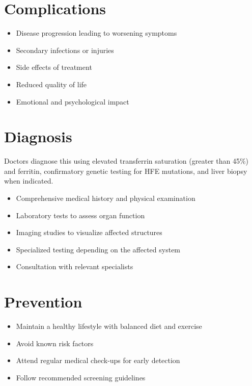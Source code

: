 \section{Complications}
\begin{itemize}[noitemsep]
  \item Disease progression leading to worsening symptoms
  \item Secondary infections or injuries
  \item Side effects of treatment
  \item Reduced quality of life
  \item Emotional and psychological impact
\end{itemize}
\section{Diagnosis}
Doctors diagnose this using elevated transferrin saturation (greater than 45\%) and ferritin, confirmatory genetic testing for HFE mutations, and liver biopsy when indicated.

\begin{itemize}[noitemsep]
  \item Comprehensive medical history and physical examination
  \item Laboratory tests to assess organ function
  \item Imaging studies to visualize affected structures
  \item Specialized testing depending on the affected system
  \item Consultation with relevant specialists
\end{itemize}
\section{Prevention}
\begin{itemize}[noitemsep]
  \item Maintain a healthy lifestyle with balanced diet and exercise
  \item Avoid known risk factors
  \item Attend regular medical check-ups for early detection
  \item Follow recommended screening guidelines
\end{itemize}
